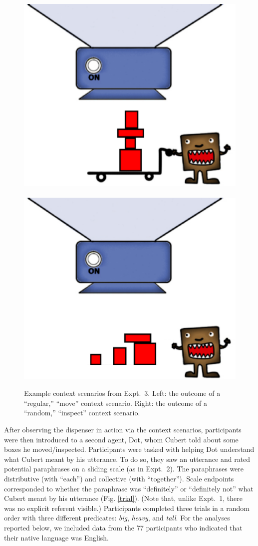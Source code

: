 \documentclass[linguex]{sp}
\newcommand{\ndg}[1]{\textcolor{Green}{[ndg: #1]}}
\begin{document}
\begin{figure}[h]
\centering
\includegraphics[width=.45\textwidth]{images/context13reg.eps}
\ \ \ \ 
\includegraphics[width=.45\textwidth]{images/context13nodolly.eps}
\caption{Example context scenarios from Expt.~3. Left: the outcome of a ``regular,'' ``move'' context scenario. Right: the outcome of a ``random,'' ``inspect'' context scenario.\label{expt2context}}
\end{figure}


After observing the dispenser in action via the context  scenarios, participants were then introduced to a second agent, Dot, whom Cubert told about some boxes he moved/inspected. Participants were tasked with helping Dot understand what Cubert meant by his utterance. To do so, they saw an utterance and rated potential paraphrases on a sliding scale (as in Expt.~2). The paraphrases were distributive (with  ``each'') and collective (with ``together'').  Scale endpoints corresponded to whether the paraphrase was ``definitely'' or ``definitely not'' what Cubert meant by his utterance (Fig. \ref{trial}). (Note that, unlike Expt.~1, there was no explicit referent visible.) Participants completed three trials in a random order with three different predicates: \emph{big}, \emph{heavy}, and \emph{tall}. For the analyses reported below, we included data from the 77 participants who indicated that their native language was English.

\end{document}
